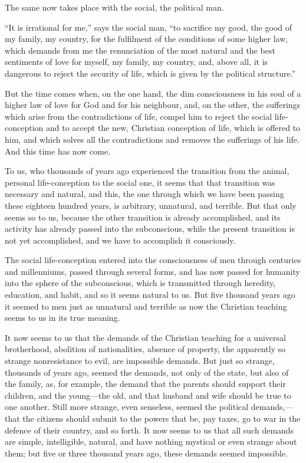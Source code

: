 \documentclass{book}
\begin{document}
The same now takes place with the social, the political man.

“It is irrational for me,” says the social man, “to sacrifice my good, the good of my family, my country, for the fulfilment of the conditions of some higher law, which demands from me the renunciation of the most natural and the best sentiments of love for myself, my family, my country, and, above all, it is dangerous to reject the security of life, which is given by the political structure.”

But the time comes when, on the one hand, the dim consciousness in his soul of a higher law of love for God and for his neighbour, and, on the other, the sufferings which arise from the contradictions of life, compel him to reject the social life-conception and to accept the new, Christian conception of life, which is offered to him, and which solves all the contradictions and removes the sufferings of his life. And this time has now come.

To us, who thousands of years ago experienced the transition from the animal, personal life-conception to the social one, it seems that that transition was necessary and natural, and this, the one through which we have been passing these eighteen hundred years, is arbitrary, unnatural, and terrible. But that only seems so to us, because the other transition is already accomplished, and its activity has already passed into the subconscious, while the present transition is not yet accomplished, and we have to accomplish it consciously.

The social life-conception entered into the consciousness of men through centuries and millenniums, passed through several forms, and has now passed for humanity into the sphere of the subconscious, which is transmitted through heredity, education, and habit, and so it seems natural to us. But five thousand years ago it seemed to men just as unnatural and terrible as now the Christian teaching seems to us in its true meaning.

It now seems to us that the demands of the Christian teaching for a universal brotherhood, abolition of nationalities, absence of property, the apparently so strange nonresistance to evil, are impossible demands. But just so strange, thousands of years ago, seemed the demands, not only of the state, but also of the family, as, for example, the demand that the parents should support their children, and the young—the old, and that husband and wife should be true to one another. Still more strange, even senseless, seemed the political demands,—that the citizens should submit to the powers that be, pay taxes, go to war in the defence of their country, and so forth. It now seems to us that all such demands are simple, intelligible, natural, and have nothing mystical or even strange about them; but five or three thousand years ago, these demands seemed impossible.
\end{document}
